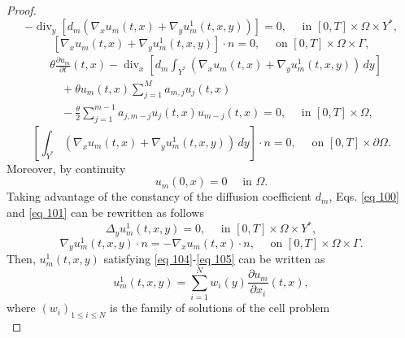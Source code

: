 \begin{proof}
\begin{equation}
 -\operatorname{div}_{y}\left[d_{m}\left(\nabla_{x} u_{m}(t, x)+\nabla_{y} u_{m}^{1}(t, x, y)\right)\right]=0, \quad \text { in }[0, T] \times \Omega \times Y^{*},
\label{eq 100}\end{equation}
\begin{equation}
 \left[\nabla_{x} u_{m}(t, x)+\nabla_{y} u_{m}^{1}(t, x, y)\right] \cdot n=0, \quad \text { on }[0, T] \times \Omega \times \Gamma,
\label{eq 101}\end{equation}
\begin{equation}
\begin{aligned}
&\theta \frac{\partial u_{m}}{\partial t}(t, x)-\operatorname{div}_{x}\left[d_{m} \int_{Y^{*}}\left(\nabla_{x} u_{m}(t, x)+\nabla_{y} u_{m}^{1}(t, x, y)\right) \, d  y\right] \\
&\quad+\theta u_{m}(t, x) \sum_{j=1}^{M} a_{m, j} u_{j}(t, x) \\
&\quad-\frac{\theta}{2} \sum_{j=1}^{m-1} a_{j, m-j} u_{j}(t, x) u_{m-j}(t, x)=0, \quad \text { in }[0, T] \times \Omega,
\end{aligned}
\label{eq 102}\end{equation}
\begin{equation}
 \left[\int_{Y^{*}}\left(\nabla_{x} u_{m}(t, x)+\nabla_{y} u_{m}^{1}(t, x, y)\right) \, d  y\right] \cdot n=0, \quad \text { on }[0, T] \times \partial \Omega.
\label{eq 103}\end{equation}
Moreover, by continuity
$$
u_{m}(0, x)=0 \quad \text { in } \Omega .
$$
Taking advantage of the constancy of the diffusion coefficient $d_{m}$, Eqs. \eqref{eq 100} and \eqref{eq 101} can be rewritten as follows
\begin{equation}
 \Delta_{y} u_{m}^{1}(t, x, y)=0, \quad \text { in }[0, T] \times \Omega \times Y^{*},
\label{eq 104}\end{equation}
\begin{equation}
 \nabla_{y} u_{m}^{1}(t, x, y) \cdot n=-\nabla_{x} u_{m}(t, x) \cdot n, \quad \text { on }[0, T] \times \Omega \times \Gamma.
\label{eq 105}\end{equation}
Then, $u_{m}^{1}(t, x, y)$ satisfying \eqref{eq 104}-\eqref{eq 105} can be written as 
\begin{equation}
 u_{m}^{1}(t, x, y)=\sum_{i=1}^{N} w_{i}(y) \frac{\partial u_{m}}{\partial x_{i}}(t, x),
\label{eq 106}\end{equation}
where $\left(w_{i}\right)_{1 \leq i \leq N}$ is the family of solutions of the cell problem
\begin{equation}

\end{equation}
\end{proof}
